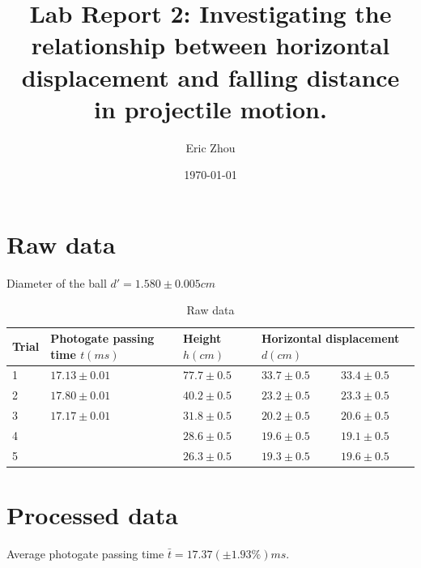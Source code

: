 \documentclass[a4paper]{article}
\begin{document}
\begin{titlepage}
    \title{\textbf{Lab Report 2: Investigating the relationship between horizontal displacement and falling distance in projectile motion.}}
    \author{Eric Zhou}
    \date{\today}
    \maketitle
\end{titlepage}

\section{Raw data}

Diameter of the ball $d' = 1.580 \pm 0.005 cm$

\begin{table}[h]
    \centering
    \begin{tabular}{lllll}
        \hline
        \textbf{Trial} & \textbf{Photogate passing time $t(ms)$} & \textbf{Height $h(cm)$} & \multicolumn{2}{l}{\textbf{Horizontal displacement $d(cm)$}} \\ \hline
        1              & $17.13 \pm 0.01$                        & $77.7 \pm 0.5$          & $33.7 \pm 0.5$                & $33.4 \pm 0.5$               \\
        2              & $17.80 \pm 0.01$                        & $40.2 \pm 0.5$          & $23.2 \pm 0.5$                & $23.3 \pm 0.5$               \\
        3              & $17.17 \pm 0.01$                        & $31.8 \pm 0.5$          & $20.2 \pm 0.5$                & $20.6 \pm 0.5$               \\
        4              &                                         & $28.6 \pm 0.5$          & $19.6 \pm 0.5$                & $19.1 \pm 0.5$               \\
        5              &                                         & $26.3 \pm 0.5$          & $19.3 \pm 0.5$                & $19.6\pm 0.5$                \\ \hline
    \end{tabular}
    \caption{Raw data}
\end{table}

\section{Processed data}

Average photogate passing time $\bar{t} = 17.37 (\pm 1.93\%) ms$.
\end{document}
